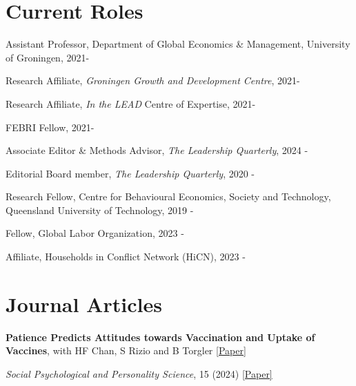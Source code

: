 \documentclass[letterpaper]{article}
\renewenvironment{itemize}{
  \begin{list}{}{
    \setlength{\leftmargin}{1.5em}
  }
}{
  \end{list}
}
\begin{document}
\section*{ Current Roles}

\begin{itemize}
	
	\item Assistant Professor, Department of Global Economics \& Management, University of Groningen, 2021-
	\begin{itemize}
	\item Research Affiliate, \textit{Groningen Growth and Development Centre}, 2021-
	\item Research Affiliate, \textit{In the LEAD} Centre of Expertise, 2021-
	\item FEBRI Fellow, 2021-
	\end{itemize}
	\item Associate Editor \& Methods Advisor, \textit{The Leadership Quarterly}, 2024 -
	\item Editorial Board member, \textit{The Leadership Quarterly}, 2020 -
	\item Research Fellow, Centre for Behavioural Economics, Society and Technology, Queensland University of Technology, 2019 -
	\item Fellow, Global Labor Organization, 2023 -
	\item Affiliate, Households in Conflict Network (HiCN), 2023 -
\end{itemize}


	


\section*{Journal Articles}

\begin{itemize}
			\item {\bf Patience Predicts Attitudes towards Vaccination and Uptake of Vaccines}, with HF Chan, S Rizio and B Torgler \href{https://journals.sagepub.com/doi/full/10.1177/19485506231189905}{[Paper]}
 			\vspace{-0.05in}
	\item \textit{Social Psychological and Personality Science}, 15 (2024) \href{https://journals.sagepub.com/doi/full/10.1177/19485506231189905/}{[Paper]}
	
\end{itemize}
				\medskip
		
\end{document}
